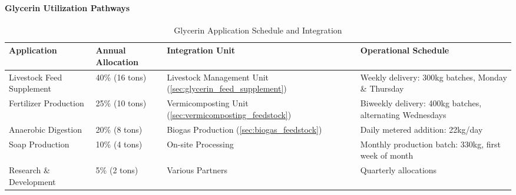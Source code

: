\paragraph{Glycerin Utilization Pathways}
\label{sec:glycerin_applications}
\begin{table}[h]
\centering
\caption{Glycerin Application Schedule and Integration}
\label{tab:glycerin_utilization}
\begin{tabular}{|p{4cm}|p{2.5cm}|p{3cm}|p{4cm}|}
\hline
\textbf{Application} & \textbf{Annual Allocation} & \textbf{Integration Unit} & \textbf{Operational Schedule} \\
\hline
Livestock Feed Supplement & 40\% (16 tons) & Livestock Management Unit (\ref{sec:glycerin_feed_supplement}) & Weekly delivery: 300kg batches, Monday \& Thursday \\
\hline
Fertilizer Production & 25\% (10 tons) & Vermicomposting Unit (\ref{sec:vermicomposting_feedstock}) & Biweekly delivery: 400kg batches, alternating Wednesdays \\
\hline
Anaerobic Digestion & 20\% (8 tons) & Biogas Production (\ref{sec:biogas_feedstock}) & Daily metered addition: 22kg/day \\
\hline
Soap Production & 10\% (4 tons) & On-site Processing & Monthly production batch: 330kg, first week of month \\
\hline
Research \& Development & 5\% (2 tons) & Various Partners & Quarterly allocations \\
\hline
\end{tabular}
\end{table}

